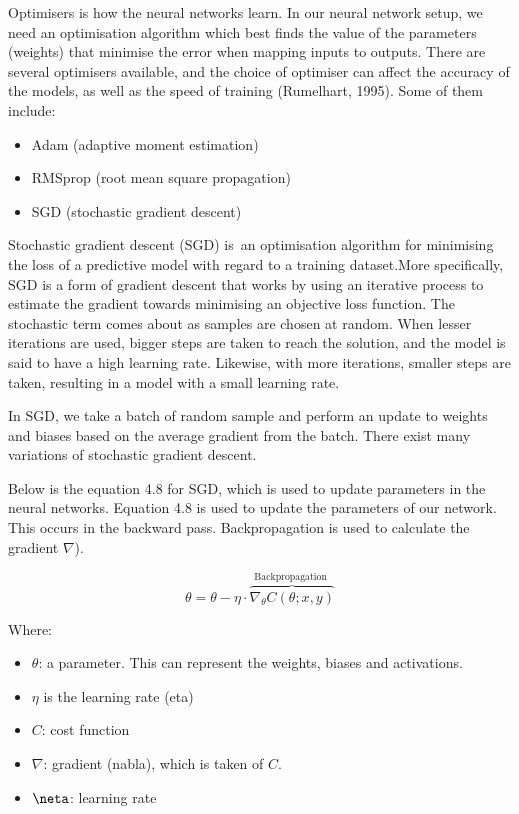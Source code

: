 Optimisers is how the neural networks learn. In our neural network setup, we need an optimisation algorithm which best finds the value of the parameters (weights) that minimise the error when mapping inputs to outputs. There are several optimisers available, and the choice of optimiser can affect the accuracy of the models, as well as the speed of training (Rumelhart, 1995). Some of them include:

\begin{itemize}
\item Adam (adaptive moment estimation) 
\item RMSprop (root mean square propagation) 
\item SGD (stochastic gradient descent) 
\end{itemize}

Stochastic gradient descent (SGD) is an optimisation algorithm for minimising the loss of a predictive model with regard to a training dataset.More specifically, SGD is a form of gradient descent that works by using an iterative process to estimate the gradient towards minimising an objective loss function. The stochastic term comes about as samples are chosen at random. When lesser iterations are used, bigger steps are taken to reach the solution, and the model is said to have a high learning rate. Likewise, with more iterations, smaller steps are taken, resulting in a model with a small learning rate. 

In SGD, we take a batch of random sample and perform an update to weights and biases based on the average gradient from the batch. There exist many variations of stochastic gradient descent. 

Below is the equation 4.8 for SGD, which is used to update parameters in the neural networks. Equation 4.8 is used  to update the parameters of our network. This occurs in the backward pass. Backpropagation is used to calculate the gradient $\nabla$).

\begin{equation}
\theta=\theta-\eta \cdot \overbrace{\nabla_{\theta} C(\theta ; x, y)}^{\text {Backpropagation }}
\end{equation}

Where:
\begin{itemize}
\item $\theta$: a parameter. This can represent the weights, biases and activations. \item $\eta$ is the learning rate (eta)
\item $C$: cost function
\item $\nabla$: gradient (nabla), which is taken of $C$.
\item $\neta$: learning rate
\end{itemize}

